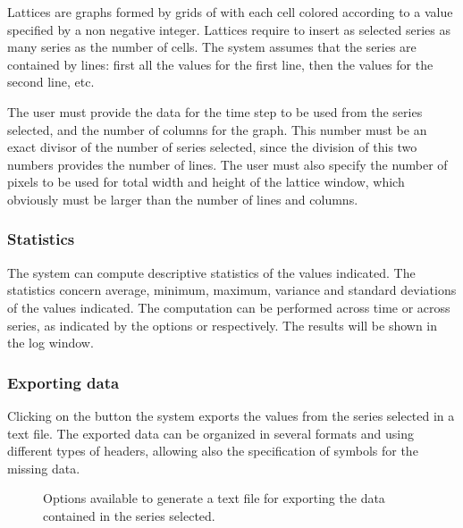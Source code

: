 \documentclass [11pt,a4paper] {book}
\begin{document}
Lattices are graphs formed by grids of with each cell colored according to a value specified by a non negative integer. Lattices require to insert as selected series as many series as the number of cells. The system assumes that the series are contained by lines: first all the values for the first line, then the values for the second line, etc. 

The user must provide the data for the time step to be used from the series selected, and the number of columns for the graph. This number must be an exact divisor of the number of series selected, since the division of this two numbers provides the number of lines. The user must also specify the number of pixels to be used for total width and height of the lattice window, which obviously must be larger than the number of lines and columns.


\subsubsection{Statistics}

The system can compute descriptive statistics of the values indicated. The statistics concern average, minimum, maximum, variance and standard deviations of the values indicated. The computation can be performed across time or across series, as indicated by the options  or  respectively. The results will be shown in the log window.

\subsubsection{Exporting data}

Clicking on the  button the system exports the values from the series selected in a text file. The exported data can be organized in several formats and using different types of headers, allowing also the specification of symbols for the missing data. 

\begin{figure}[ht]
  \centering
  \caption{\small Options available to generate a text file for exporting the data contained in the series selected.}
  \label{fig:export}
\end{figure}
\end{document}

